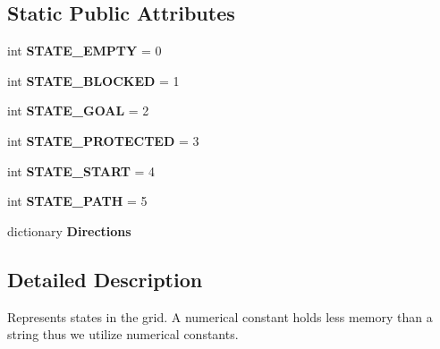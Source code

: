 \subsection*{Static Public Attributes}
\begin{DoxyCompactItemize}
\item 
\hypertarget{classoctile__grid_1_1_octile_grid_ab51a7b7724f7c7521436bcc44493602e}{}int {\bfseries S\+T\+A\+T\+E\+\_\+\+E\+M\+P\+T\+Y} = 0\label{classoctile__grid_1_1_octile_grid_ab51a7b7724f7c7521436bcc44493602e}

\item 
\hypertarget{classoctile__grid_1_1_octile_grid_a3cf3487fd145c0015cf2ecd9634e0591}{}int {\bfseries S\+T\+A\+T\+E\+\_\+\+B\+L\+O\+C\+K\+E\+D} = 1\label{classoctile__grid_1_1_octile_grid_a3cf3487fd145c0015cf2ecd9634e0591}

\item 
\hypertarget{classoctile__grid_1_1_octile_grid_ad6395a8541e25990963f091f3bbe37ba}{}int {\bfseries S\+T\+A\+T\+E\+\_\+\+G\+O\+A\+L} = 2\label{classoctile__grid_1_1_octile_grid_ad6395a8541e25990963f091f3bbe37ba}

\item 
\hypertarget{classoctile__grid_1_1_octile_grid_ac0e69056e1de947d6d81917adc9eafb7}{}int {\bfseries S\+T\+A\+T\+E\+\_\+\+P\+R\+O\+T\+E\+C\+T\+E\+D} = 3\label{classoctile__grid_1_1_octile_grid_ac0e69056e1de947d6d81917adc9eafb7}

\item 
\hypertarget{classoctile__grid_1_1_octile_grid_a7cba36475acd7b935a86f7823d9b43a6}{}int {\bfseries S\+T\+A\+T\+E\+\_\+\+S\+T\+A\+R\+T} = 4\label{classoctile__grid_1_1_octile_grid_a7cba36475acd7b935a86f7823d9b43a6}

\item 
\hypertarget{classoctile__grid_1_1_octile_grid_ae9403beb7b4763d183f39167bc4572aa}{}int {\bfseries S\+T\+A\+T\+E\+\_\+\+P\+A\+T\+H} = 5\label{classoctile__grid_1_1_octile_grid_ae9403beb7b4763d183f39167bc4572aa}

\item 
\hypertarget{classoctile__grid_1_1_octile_grid_ac8fc606af321cd0906c4fa7dc4c8d0ce}{}dictionary {\bfseries Directions}\label{classoctile__grid_1_1_octile_grid_ac8fc606af321cd0906c4fa7dc4c8d0ce}

\end{DoxyCompactItemize}


\subsection{Detailed Description}
\begin{DoxyVerb}Represents states in the grid. A numerical constant holds less memory than a string thus we utilize numerical
constants.
\end{DoxyVerb}
 

